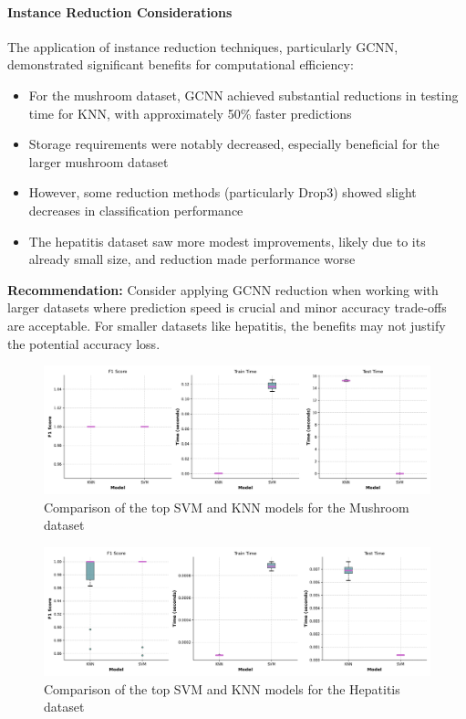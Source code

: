 \paragraph{Instance Reduction Considerations}
The application of instance reduction techniques, particularly GCNN, demonstrated significant benefits for computational efficiency:

\begin{itemize}
    \item For the mushroom dataset, GCNN achieved substantial reductions in testing time for KNN, with approximately 50\% faster predictions
    \item Storage requirements were notably decreased, especially beneficial for the larger mushroom dataset
    \item However, some reduction methods (particularly Drop3) showed slight decreases in classification performance
    \item The hepatitis dataset saw more modest improvements, likely due to its already small size, and reduction made performance worse
\end{itemize}

\textbf{Recommendation:} Consider applying GCNN reduction when working with larger datasets where prediction speed is crucial and minor accuracy trade-offs are acceptable. For smaller datasets like hepatitis, the benefits may not justify the potential accuracy loss.

\begin{figure}
    \centering
    \includegraphics[width=\textwidth]{figures/model_comparison_mushroom.png}
    \caption{Comparison of the top SVM and KNN models for the Mushroom dataset}
    \label{fig:model-comparison-mushroom}
\end{figure}

\begin{figure}
    \centering
    \includegraphics[width=\textwidth]{figures/model_comparison_hepatitis.png}
    \caption{Comparison of the top SVM and KNN models for the Hepatitis dataset}
    \label{fig:model-comparison-hepatitis}
\end{figure}


